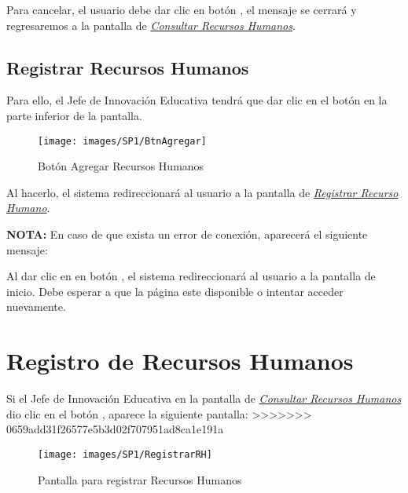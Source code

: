        	Para cancelar, el usuario debe dar clic en botón , el mensaje se cerrará y regresaremos a la pantalla de \hyperlink{consultarrh}{\textit{Consultar Recursos Humanos}}.\\

    	\subsection{Registrar Recursos Humanos}

        	Para ello, el Jefe de Innovación Educativa tendrá que dar clic en el botón \IUbutton{+} en la parte inferior de la pantalla.
        
        	\begin{figure}[!hbtp]
        		\centering
        		\hypertarget{add}{\texttt{[image: images/SP1/BtnAgregar]}}
        		\caption{Botón Agregar Recursos Humanos}
        		\label{add}
        	\end{figure}
        
        	Al hacerlo, el sistema redireccionará al usuario a la pantalla de \hyperlink{registrarrh}{\textit{Registrar Recurso Humano}}.
        
        
            \textbf{NOTA:} En caso de que exista un error de conexión, aparecerá el siguiente mensaje:
        
            Al dar clic en en botón , el sistema redireccionará al usuario a la pantalla de inicio. Debe esperar a que la página este disponible o intentar acceder nuevamente.
\newpage
    
    \section{Registro de Recursos Humanos}
        Si el Jefe de Innovación Educativa en la pantalla de \hyperlink{consultarrh}{\textit{Consultar Recursos Humanos}} dio clic en el botón \IUbutton{+}, aparece la siguiente pantalla:
>>>>>>> 0659add31f26577e5b3d02f707951ad8ca1e191a

        \begin{figure}[!hbtp]
            \centering
            \hypertarget{registrarrh}{\texttt{[image: images/SP1/RegistrarRH]}}
            \caption{Pantalla para registrar Recursos Humanos}
            \label{registrarrh}
        \end{figure}


